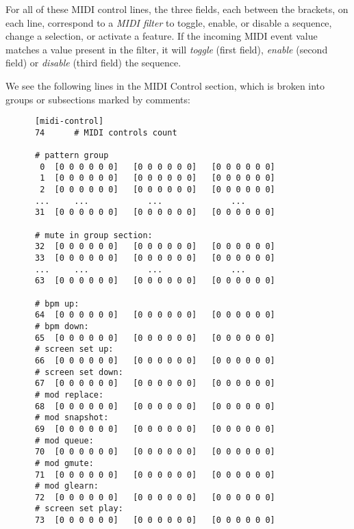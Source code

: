    For all of these MIDI control lines,
   the three fields, each between the brackets, on each line, correspond to a
   \textsl{MIDI filter} to toggle, enable, or disable a sequence, change a
   selection, or activate a feature.
   If the incoming MIDI event value matches a value present in the filter, it
   will \textsl{toggle} (first field), \textsl{enable} (second field) or
   \textsl{disable} (third field) the sequence.

   We see the following lines in the MIDI Control section, which is broken
   into groups or subsections marked by comments:

   \begin{verbatim}
      [midi-control]
      74      # MIDI controls count

      # pattern group
       0  [0 0 0 0 0 0]   [0 0 0 0 0 0]   [0 0 0 0 0 0]            
       1  [0 0 0 0 0 0]   [0 0 0 0 0 0]   [0 0 0 0 0 0]          
       2  [0 0 0 0 0 0]   [0 0 0 0 0 0]   [0 0 0 0 0 0]   
      ...     ...            ...              ...
      31  [0 0 0 0 0 0]   [0 0 0 0 0 0]   [0 0 0 0 0 0]    

      # mute in group section:
      32  [0 0 0 0 0 0]   [0 0 0 0 0 0]   [0 0 0 0 0 0]   
      33  [0 0 0 0 0 0]   [0 0 0 0 0 0]   [0 0 0 0 0 0]   
      ...     ...            ...              ...
      63  [0 0 0 0 0 0]   [0 0 0 0 0 0]   [0 0 0 0 0 0]   

      # bpm up:
      64  [0 0 0 0 0 0]   [0 0 0 0 0 0]   [0 0 0 0 0 0]   
      # bpm down:
      65  [0 0 0 0 0 0]   [0 0 0 0 0 0]   [0 0 0 0 0 0]   
      # screen set up:
      66  [0 0 0 0 0 0]   [0 0 0 0 0 0]   [0 0 0 0 0 0]   
      # screen set down:
      67  [0 0 0 0 0 0]   [0 0 0 0 0 0]   [0 0 0 0 0 0]   
      # mod replace:
      68  [0 0 0 0 0 0]   [0 0 0 0 0 0]   [0 0 0 0 0 0]   
      # mod snapshot:
      69  [0 0 0 0 0 0]   [0 0 0 0 0 0]   [0 0 0 0 0 0]   
      # mod queue:
      70  [0 0 0 0 0 0]   [0 0 0 0 0 0]   [0 0 0 0 0 0]   
      # mod gmute:
      71  [0 0 0 0 0 0]   [0 0 0 0 0 0]   [0 0 0 0 0 0]   
      # mod glearn:
      72  [0 0 0 0 0 0]   [0 0 0 0 0 0]   [0 0 0 0 0 0]   
      # screen set play:
      73  [0 0 0 0 0 0]   [0 0 0 0 0 0]   [0 0 0 0 0 0]   
   \end{verbatim}

